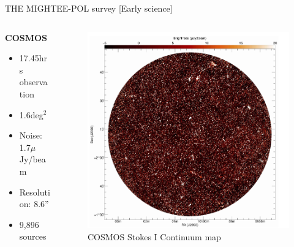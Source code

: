 \documentclass[xetex,aspectratio=169]{beamer}
\begin{document}
\begin{frame}{THE MIGHTEE-POL survey [Early science]}
	\begin{columns}[onlytextwidth,t]
		\begin{column}{.5\textwidth}
			\textbf{COSMOS}
			\begin{itemize}
				\item 17.45\;hrs observation
				\item 1.6\;deg$^{2}$
				\item Noise: 1.7\;$\mu$Jy/beam
				\item  Resolution: 8.6''
				\item 9,896 sources
			\end{itemize}
		\end{column}
		\begin{column}{.5\textwidth}
			\begin{figure}
				\centering
				\includegraphics[scale=0.2]{figures/mightee_survey/cosmos.png}
				\caption*{COSMOS Stokes I Continuum map ~\parencite{mightee-pol}}
				\label{fig:cosmos}
			\end{figure}
		\end{column}%

	\end{columns}

\end{frame}
\end{document}
